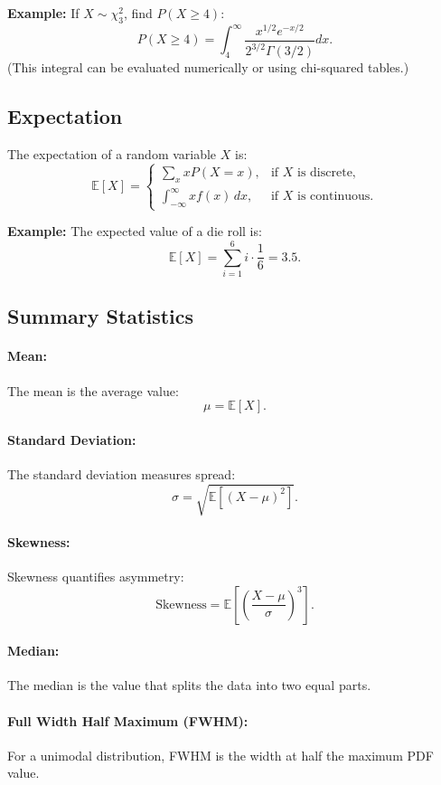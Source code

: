 \documentclass[12pt,a4paper]{article}
\begin{document}
\textbf{Example:} If \(X \sim \chi_3^2\), find \(P(X \geq 4)\):
\[
P(X \geq 4) = \int_{4}^\infty \frac{x^{1/2} e^{-x/2}}{2^{3/2} \Gamma(3/2)} dx.
\]
(This integral can be evaluated numerically or using chi-squared tables.)


\subsection{Expectation}

The expectation of a random variable \(X\) is:
\[
\mathbb{E}[X] = \begin{cases} 
\sum_x x P(X=x), & \text{if } X \text{ is discrete}, \\
\int_{-\infty}^\infty x f(x) \, dx, & \text{if } X \text{ is continuous}.
\end{cases}
\]

\textbf{Example:} The expected value of a die roll is:
\[
\mathbb{E}[X] = \sum_{i=1}^6 i \cdot \frac{1}{6} = 3.5.
\]

\subsection{Summary Statistics}

\paragraph{Mean:} The mean is the average value:
\[
\mu = \mathbb{E}[X].
\]

\paragraph{Standard Deviation:} The standard deviation measures spread:
\[
\sigma = \sqrt{\mathbb{E}[(X-\mu)^2]}.
\]

\paragraph{Skewness:} Skewness quantifies asymmetry:
\[
\text{Skewness} = \mathbb{E}\left[\left(\frac{X - \mu}{\sigma}\right)^3\right].
\]

\paragraph{Median:} The median is the value that splits the data into two equal parts.

\paragraph{Full Width Half Maximum (FWHM):} For a unimodal distribution, FWHM is the width at half the maximum PDF value.
\end{document}
